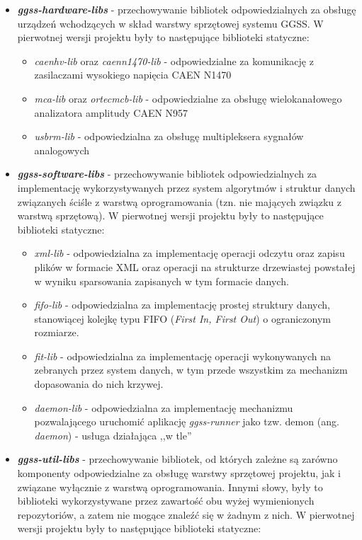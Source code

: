 \begin{itemize}
    \item \textbf{\emph{ggss-hardware-libs}} - przechowywanie bibliotek odpowiedzialnych za obsługę urządzeń wchodzących w skład warstwy sprzętowej systemu GGSS. W pierwotnej wersji projektu były to następujące biblioteki statyczne:
    \begin{itemize}
        \item \emph{caenhv-lib} oraz \emph{caenn1470-lib} - odpowiedzialne za komunikację z zasilaczami wysokiego napięcia CAEN N1470
        \item \emph{mca-lib} oraz \emph{ortecmcb-lib} - odpowiedzialne za obsługę wielokanałowego analizatora amplitudy CAEN N957
        \item \emph{usbrm-lib} - odpowiedzialna za obsługę multipleksera sygnałów analogowych
    \end{itemize}
    \item \textbf{\emph{ggss-software-libs}} - przechowywanie bibliotek odpowiedzialnych za implementację wykorzystywanych przez system algorytmów i struktur danych związanych ściśle z warstwą oprogramowania (tzn. nie mających związku z warstwą sprzętową). W pierwotnej wersji projektu były to następujące biblioteki statyczne:
    \begin{itemize}
        \item \emph{xml-lib} - odpowiedzialna za implementację operacji odczytu oraz zapisu plików w formacie XML oraz operacji na strukturze drzewiastej powstałej w wyniku sparsowania zapisanych w tym formacie danych.
        \item \emph{fifo-lib} - odpowiedzialna za implementację prostej struktury danych, stanowiącej kolejkę typu FIFO (\emph{First In, First Out}) o ograniczonym rozmiarze.
        \item \emph{fit-lib} - odpowiedzialna za implementację operacji wykonywanych na zebranych przez system danych, w tym przede wszystkim za mechanizm dopasowania do nich krzywej.
        \item \emph{daemon-lib} - odpowiedzialna za implementację mechanizmu pozwalającego uruchomić aplikację \emph{ggss-runner} jako tzw. demon (ang. \emph{daemon}) - usługa działająca ,,w tle''
    \end{itemize}
    \item \textbf{\emph{ggss-util-libs}} - przechowywanie bibliotek, od których zależne są zarówno komponenty odpowiedzialne za obsługę warstwy sprzętowej projektu, jak i związane wyłącznie z warstwą oprogramowania. Innymi słowy, były to biblioteki wykorzystywane przez zawartość obu wyżej wymienionych repozytoriów, a zatem nie mogące znaleźć się w żadnym z nich. W pierwotnej wersji projektu były to następujące biblioteki statyczne:

\end{itemize}
